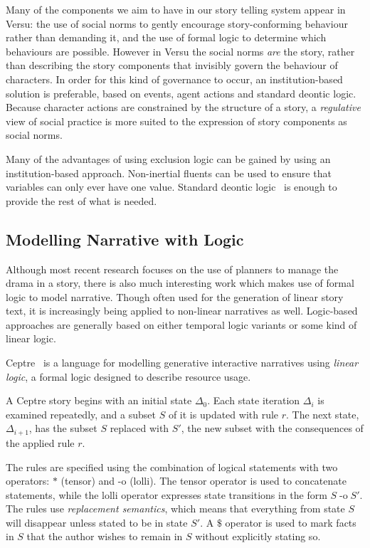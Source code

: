\documentclass[11pt]{report}
\begin{document}
Many of the components we aim to have in our story telling system appear in Versu: the use of social norms to gently encourage story-conforming behaviour rather than demanding it, and the use of formal logic to determine which behaviours are possible. However in Versu the social norms \emph{are} the story, rather than describing the story components that invisibly govern the behaviour of characters. In order for this kind of governance to occur, an institution-based solution is preferable, based on events, agent actions and standard deontic logic. Because character actions are constrained by the structure of a story, a \emph{regulative}  view of social practice is more suited to the expression of story components as social norms.

Many of the advantages of using exclusion logic can be gained by using an institution-based approach. Non-inertial fluents can be used to ensure that variables can only ever have one value. Standard deontic logic~\citep{von1951deontic} is enough to provide the rest of what is needed.

\subsection{Modelling Narrative with Logic}
\label{sec:model-logic}
Although most recent research focuses on the use of planners to manage the drama in a story, there is also much interesting work which makes use of formal logic to model narrative. Though often used for the generation of linear story text, it is increasingly being applied to non-linear narratives as well. Logic-based approaches are generally based on either temporal logic variants or some kind of linear logic.

Ceptre~\citep{martens2015ceptre} is a language for modelling generative interactive narratives using \emph{linear logic}, a formal logic designed to describe resource usage. 

A Ceptre story begins with an initial state $\Delta_0$. Each state iteration
$\Delta_i$ is examined repeatedly, and a subset $S$ of it is updated with rule
$r$. The next state, $\Delta_{i+1}$, has the subset $S$ replaced with $S'$, the
new subset with the consequences of the applied rule $r$.

The rules are specified using the combination of logical statements with two
operators: $*$ (tensor) and $\text{-o}$ (lolli). The tensor operator is used to
concatenate statements, while the lolli operator expresses state transitions in
the form $S \mathrel{\text{-o}} S'$. The rules use \emph{replacement semantics},
which means that everything from state $S$ will disappear unless stated to be in
state $S'$. A $\$$ operator is used to mark facts in $S$ that the author wishes
to remain in $S$ without explicitly stating so.
\end{document}
